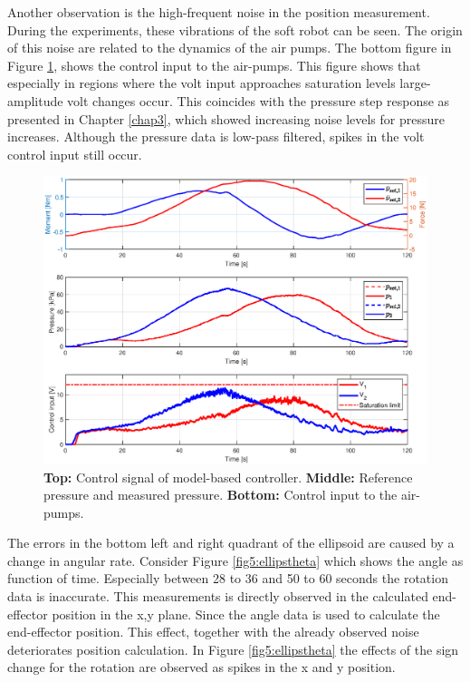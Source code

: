 Another observation is the high-frequent noise in the position measurement. During the experiments, these vibrations of the soft robot can be seen. The origin of this noise are related to the dynamics of the air pumps. The bottom figure in Figure \ref{fig5:controlellips}, shows the control input to the air-pumps. This figure shows that especially in regions where the volt input approaches saturation levels large-amplitude volt changes occur. This coincides with the pressure step response as presented in Chapter \ref{chap3}, which showed increasing noise levels for pressure increases. Although the pressure data is low-pass filtered, spikes in the volt control input still occur. 


\begin{figure}[H]
    \centering
    \includegraphics[width = \textwidth]{Figures/Chapter5/input.eps}
    \caption{\textbf{Top:} Control signal of model-based controller. \textbf{Middle:} Reference pressure and measured pressure. \textbf{Bottom:} Control input to the air-pumps.}
    \label{fig5:controlellips}
\end{figure}

The errors in the bottom left and right quadrant of the ellipsoid are caused by a change in angular rate. Consider Figure \ref{fig5:ellipstheta} which shows the angle as function of time. Especially between 28 to 36 and 50 to 60 seconds the rotation data is inaccurate. This measurements is directly observed in the calculated end-effector position in the x,y plane. Since the angle data is used to calculate the end-effector position. This effect, together with the already observed noise deteriorates position calculation. In Figure \ref{fig5:ellipstheta} the effects of the sign change for the rotation are observed as spikes in the x and y position.


